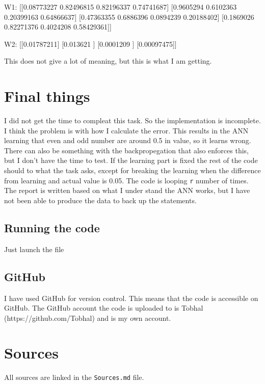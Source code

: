 \documentclass[10pt]{article}
\begin{document}
    \begin{pythoncode}
    W1:
    [[0.08773227 0.82496815 0.82196337 0.74741687]
     [0.9605294  0.6102363  0.20399163 0.64866637]
     [0.47363355 0.6886396  0.0894239  0.20188402]
     [0.1869026  0.82271376 0.4024208  0.58429361]]

    W2:
    [[0.01787211]
     [0.013621  ]
     [0.0001209 ]
     [0.00097475]]
    \end{pythoncode}

    This does not give a lot of meaning, but this is what I am getting.

    \section{Final things}
    I did not get the time to compleat this task. So the implementation is incomplete. I think the problem is with how I calculate the error. This results in the ANN learning that even and odd number are around 0.5 in value, so it learns wrong. There can also be something with the backpropegation that also enforces this, but I don't have the time to test. If the learning part is fixed the rest of the code should to what the task asks, except for breaking the learning when the difference from learning and actual value is 0.05. The code is looping \texttt{r} number of times. The report is written based on what I under stand the ANN works, but I have not been able to produce the data to back up the statements.

    \subsection{Running the code}
    Just launch the file

    \subsection{GitHub}
    I have used GitHub for version control. This means that the code is accessible on GitHub. The GitHub account the code is uploaded to is Tobhal (https://github.com/Tobhal) and is my own account. 

    \section{Sources}
    All sources are linked in the \texttt{Sources.md} file.
    
\end{document}
